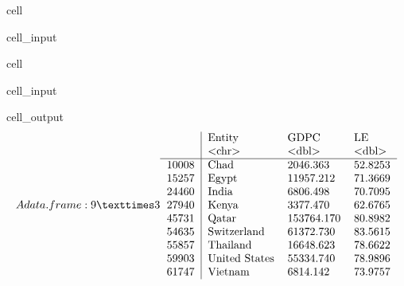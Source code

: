 \documentclass[letterpaper,10pt,english]{jupyterBook}
\begin{document}
\begin{sphinxuseclass}{cell}\begin{sphinxVerbatimInput}

\begin{sphinxuseclass}{cell_input}
\begin{sphinxVerbatim}[commandchars=\\\{\}]
\PYG{p}{[}\PYG{p}{]}
\end{sphinxVerbatim}

\end{sphinxuseclass}\end{sphinxVerbatimInput}

\end{sphinxuseclass}
\begin{sphinxuseclass}{cell}\begin{sphinxVerbatimInput}

\begin{sphinxuseclass}{cell_input}
\begin{sphinxVerbatim}[commandchars=\\\{\}]
\end{sphinxVerbatim}

\end{sphinxuseclass}\end{sphinxVerbatimInput}
\begin{sphinxVerbatimOutput}

\begin{sphinxuseclass}{cell_output}\begin{equation*}
\begin{split}A data.frame: 9 × 3
\begin{tabular}{r|lll}
  & Entity & GDPC & LE\\
  & <chr> & <dbl> & <dbl>\\
\hline
	10008 & Chad          &   2046.363 & 52.8253\\
	15257 & Egypt         &  11957.212 & 71.3669\\
	24460 & India         &   6806.498 & 70.7095\\
	27940 & Kenya         &   3377.470 & 62.6765\\
	45731 & Qatar         & 153764.170 & 80.8982\\
	54635 & Switzerland   &  61372.730 & 83.5615\\
	55857 & Thailand      &  16648.623 & 78.6622\\
	59903 & United States &  55334.740 & 78.9896\\
	61747 & Vietnam       &   6814.142 & 73.9757\\
\end{tabular}\end{split}
\end{equation*}
\end{sphinxuseclass}\end{sphinxVerbatimOutput}

\end{sphinxuseclass}
\end{document}
